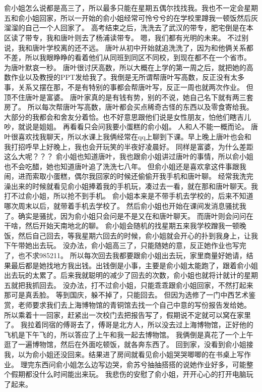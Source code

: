 \chapter{}
俞小姐怎么说都是高三了，所以最多只能在星期五偶尔找找我。我也不一定会星期五和俞小姐回家，所以一开始的俞小姐经常可怜兮兮的在学校里蹲我一顿饭然后灰溜溜的自己一个人回家了。
高考结束之后，洗洗去了武汉的带专，肥宅倒是在本区读了带专，我和唐叶则去了杨浦读带专。
嗯，我们都有光明的未来。
不过别说，我和唐叶学校离的还不远。
唐叶从初中开始就追洗洗了，因为和他俩关系都不差，所以我眼睁睁的看着他们从同班到同区不同校，到现在都不在一个省市。
为唐叶默哀一秒。
唐叶很讨厌高数，所以大概在上学的第一周之后，就把她的高数作业以及教授的PPT发给我了。我倒是无所谓帮唐叶写高数，反正没有太多事，关系又摆在那，不是有特别的事都会帮唐叶写，反正一周也就两次作业。
但顶不住唐叶是富婆。
唐叶家真的是有钱有势，别的不说，她自己名下就有两三套房了。
所以每次帮唐叶写高数，唐叶都会买点稀奇古怪的东西以及零食寄给我。大部分的我都会和舍友分着恰。也不好意思跟他们说是女性朋友，怕他们瞎吉儿吵，就说是姐姐。
再看看只会问我要小蛋糕的俞小姐。
人和人不能一概而论。
唐叶很喜欢找我聊天，所以水课上我俩经常在qq上聊到下课。早上晚上唐叶也会和我打招呼早上好晚上，我也会开玩笑的半夜好凌晨好。
同样是富婆，为什么差距这么大呢？？？
俞小姐也知道唐叶，我也跟俞小姐讲过唐叶的事情，所以俞小姐也不会吃醋，她也知道唐叶追了洗洗七八年。
但俞小姐还是喜欢拿这件事跟我闹，进而索取小蛋糕，偶尔我回家的时候还偷偷开我手机和唐叶聊。
经常我洗完澡出来的时候就看见俞小姐捧着我的手机玩，凑过去一看，就在那和唐叶聊天。我打不过俞小姐，所以抢不到手机。
俞小姐本来是不带手机去学校的，后来不知道哪次周末以后，就带着手机去学校了。
然后俞小姐也开始在课间发消息骚扰我了。确实是骚扰，因为俞小姐只会问是不是又在和唐叶聊天。
而唐叶则会问问在干啥，然后开始天南地北的聊。
俞小姐会随机的找星期五来我学校蹭我一顿晚饭，然后自己回去，等我星期六回去的时候，俞小姐就会开心的扑到我身上，让我下午带她出去玩。
没办法，俞小姐高三了，只能随她的意，反正她作业也写完了，也不求985211。
所以每次回去我都要跟俞小姐出去玩，家里商量好她请，结果最后都是她找地方我出钱。出钱倒是小事，主要是俞小姐太能跑了，跟着俞小姐出去玩的太累了。后来我就聪明的减少了回去的次数，俞小姐也就将计就计的星期五就把我抓回去。
没办法，打不过俞小姐，只能乖乖跟俞小姐回家，不然打起来那可是真丢脸。
等到国庆，躲不掉了，只能回去。
但因为选修了一门中西艺术鉴赏，老师要求我们去上海博物馆的青铜馆去找一个自己中意的写份报告发给她。
所以乘着十一回家，赶紧出一次校门去把报告写了，假期说不定就可以窝在家里了。
我拉着同宿的傅哥去了，傅哥是北方人，所以没去过上海博物馆，正好他的飞机是下午飞的，所以答应了上午和我一起去博物馆。
我俩倒是真花了一个上午逛了一遍博物馆，然后在外面吃顿饭，就各奔东西了。
回到家，没看到俞小姐接我，以为俞小姐还没回来。结果进了房间就看见俞小姐哭哭唧唧的在书桌上写作业。
理完东西问俞小姐怎么边写边哭，俞苏兮抽抽搭搭的说她作业好多，可能整个假期都没什么时间能出来玩。
我悲伤的安慰了俞小姐，开开心心的打开电脑玩了起来。

